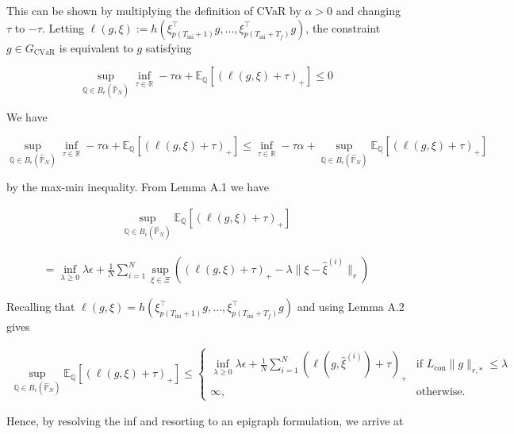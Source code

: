 \documentclass[12pt, a4paper]{article}
\begin{document}
This can be shown by multiplying the definition of CVaR by $\alpha > 0$ and changing $\tau$ to $-\tau$. Letting $\ell(g,\xi) := h(\xi_{p(T_\text{ini}+1)}^{\top}g,\ldots,\xi_{p(T_\text{ini}+T_f)}^{\top}g)$, the constraint $g \in G_\text{CVaR}$ is equivalent to $g$ satisfying

\begin{equation}
\sup_{\mathbb{Q} \in B_\epsilon(\hat{\mathbb{P}}_N)} \inf_{\tau \in \mathbb{R}} -\tau\alpha + \mathbb{E}_\mathbb{Q}[(\ell(g,\xi) + \tau)_+] \leq 0
\end{equation}

We have

\begin{equation}
\sup_{\mathbb{Q} \in B_\epsilon(\hat{\mathbb{P}}_N)} \inf_{\tau \in \mathbb{R}} -\tau\alpha + \mathbb{E}_\mathbb{Q}[(\ell(g,\xi) + \tau)_+] \leq \inf_{\tau \in \mathbb{R}} -\tau\alpha + \sup_{\mathbb{Q} \in B_\epsilon(\hat{\mathbb{P}}_N)} \mathbb{E}_\mathbb{Q}[(\ell(g,\xi) + \tau)_+] 
\end{equation}


by the max-min inequality. From Lemma A.1 we have

\begin{align}
    \sup_{\mathbb{Q} \in B_\epsilon(\hat{\mathbb{P}}_N)} \mathbb{E}_\mathbb{Q}[(\ell(g,\xi) + \tau)_+]
\end{align}

\begin{align}
    = \inf_{\lambda \geq 0} \lambda\epsilon + \frac{1}{N}\sum_{i=1}^N \sup_{\xi \in \Xi}((\ell(g,\xi) + \tau)_+ - \lambda\|\xi - \hat{\xi}^{(i)}\|_r)
\end{align}

Recalling that $\ell(g,\xi) = h(\xi_{p(T_\text{ini}+1)}^{\top}g,\ldots,\xi_{p(T_\text{ini}+T_f)}^{\top}g)$ and using Lemma A.2 gives

\begin{align}
    \sup_{\mathbb{Q} \in B_\epsilon(\hat{\mathbb{P}}_N)} \mathbb{E}_\mathbb{Q}[(\ell(g,\xi) + \tau)_+] \leq \begin{cases} 
        \inf_{\lambda \geq 0} \lambda\epsilon + \frac{1}{N}\sum_{i=1}^N (\ell(g,\hat{\xi}^{(i)}) + \tau)_+ & \text{if } L_\text{con}\|g\|_{r,*} \leq \lambda \\
        \infty, & \text{otherwise.}
        \end{cases}
\end{align}

Hence, by resolving the inf and resorting to an epigraph formulation, we arrive at
\end{document}
